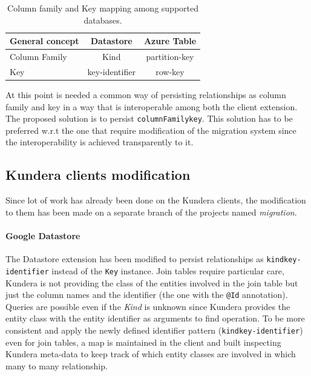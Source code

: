 \begin{table}[h]
\begin{center}
\renewcommand{\arraystretch}{1.4}
\begin{tabular}{lcc}
\hline
\textbf{General concept} & \textbf{Datastore} & \textbf{Azure Table}\\ 
\hline\hline
Column Family & Kind & partition-key \\
Key & key-identifier & row-key \\
\hline
\end{tabular}
\end{center}
\caption{Column family and Key mapping among supported databases.}
\label{table:mapping}
\end{table}

\noindent At this point is needed a common way of persisting relationships as column family and key in a way that is interoperable among both the client extension.
The proposed solution is to persist \texttt{columnFamily\textunderscore key}. This solution has to be preferred w.r.t the one that require modification of the migration system since the interoperability is achieved transparently to it.

\subsection{Kundera clients modification}
Since lot of work has already been done on the Kundera clients, the modification to them has been made on a separate branch of the projects named \textit{migration}.

\paragraph{Google Datastore} The Datastore extension has been modified to persist relationships as \texttt{kind\textunderscore key-identifier} instead of the \texttt{Key} instance.
Join tables require particular care, Kundera is not providing the class of the entities involved in the join table but just the column names and the identifier (the one with the \texttt{@Id} annotation). Queries are possible even if the \textit{Kind} is unknown since Kundera provides the entity class with the entity identifier as arguments to find operation.
To be more consistent and apply the newly defined identifier pattern (\texttt{kind\textunderscore key-identifier}) even for join tables, a map is maintained in the client and built inspecting Kundera meta-data to keep track of which entity classes are involved in which many to many relationship.

